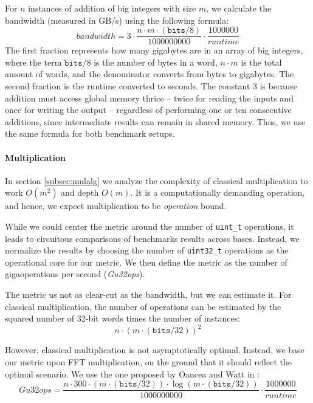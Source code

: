 For $n$ instances of addition of big integers with size $m$, we calculate the
bandwidth (measured in GB/s) using the following formula:
\begin{equation}
    \label{eq:bandwidth}
    \mathit{bandwidth} = 3 \cdot \dfrac{n \cdot m \cdot (\mathtt{bits}/8)}{1000000000} \cdot \dfrac{1000000}{\mathit{runtime}}
\end{equation}
The first fraction represents how many gigabytes are in an array of big
integers, where the term $\mathtt{bits} / 8$ is the number of bytes in a word,
$n\cdot m$ is the total amount of words, and the denominator converts from bytes to
gigabytes. The second fraction is the runtime converted to seconds. The constant
3 is because addition must access global memory thrice -- twice for reading the
inputs and once for writing the output -- regardless of performing one or ten
consecutive additions, since intermediate results can remain in shared
memory. Thus, we use the same formula for both benchmark setups.


\paragraph{Multiplication}
In section \ref{subsec:mulalg} we analyze the complexity of classical
multiplication to work $O(m^2)$ and depth $O(m)$. It is a computationally
demanding operation, and hence, we expect multiplication to be
\textit{operation} bound.

While we could center the metric around the number of \texttt{uint\_t}
operations, it leads to circuitous comparisons of benchmarks results across
bases. Instead, we normalize the results by choosing the number of
\texttt{uint32\_t} operations as the operational core for our metric. We then
define the metric as the number of gigaoperations per second (\textit{Gu32ops}).

The metric us not as clear-cut as the bandwidth, but we can estimate it. For
classical multiplication, the number of operations can be estimated by the
squared number of 32-bit words times the number of instances:
\begin{equation}
  \label{eq:u32opsobs}
  {n \cdot (m \cdot (\mathtt{bits} / 32))^2}
\end{equation}

However, classical multiplication is not asymptotically optimal. Instead, we
base our metric upon FFT multiplication, on the ground that it should reflect
the optimal scenario. We use the one proposed by Oancea and Watt in
\cite{oancea2024gpu}:
\begin{equation}
  \label{eq:u32ops}
  \mathit{Gu32ops} = \dfrac{n \cdot 300 \cdot (m \cdot (\mathtt{bits} / 32)) \cdot \log (m \cdot (\mathtt{bits} / 32))}{1000000000} \cdot \dfrac{1000000}{\mathit{runtime}}
\end{equation}

